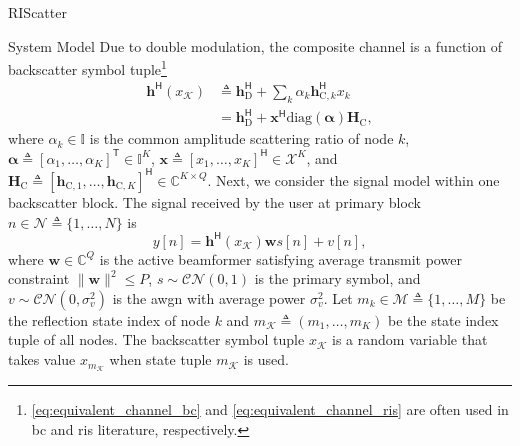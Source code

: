 \documentclass[journal]{IEEEtran}
\begin{document}
\begin{section}{RIScatter}
\begin{subsection}{System Model}
		Due to double modulation, the composite channel is a function of backscatter symbol tuple\footnote{\eqref{eq:equivalent_channel_bc} and \eqref{eq:equivalent_channel_ris} are often used in \gls{bc} and \gls{ris} literature, respectively.}
		\begin{subequations}
			\label{eq:equivalent_channel}
			\begin{align}
				\boldsymbol{h}^\mathsf{H}(x_{\mathcal{K}})
				 & \triangleq \boldsymbol{h}_{\text{D}}^\mathsf{H} + \sum_{k} \alpha_k \boldsymbol{h}_{\text{C},k}^\mathsf{H} x_k \label{eq:equivalent_channel_bc}                    \\
				 & = \boldsymbol{h}_{\text{D}}^\mathsf{H} + \boldsymbol{x}^\mathsf{H} \mathrm{diag}(\boldsymbol{\alpha}) \boldsymbol{H}_{\text{C}}, \label{eq:equivalent_channel_ris}
			\end{align}
		\end{subequations}
		where $\alpha_k \in \mathbb{I}$ is the common amplitude scattering ratio of node $k$, $\boldsymbol{\alpha} \triangleq [\alpha_1,\ldots,\alpha_K]^\mathsf{T} \in \mathbb{I}^{K}$, $\boldsymbol{x} \triangleq [x_1,\ldots,x_K]^\mathsf{H} \in \mathcal{X}^{K}$, and $\boldsymbol{H}_{\text{C}} \triangleq [\boldsymbol{h}_{\text{C},1},\ldots,\boldsymbol{h}_{\text{C},K}]^\mathsf{H} \in \mathbb{C}^{K \times Q}$.
		Next, we consider the signal model within one backscatter block.
		The signal received by the user at primary block $n \in \mathcal{N} \triangleq \{1,\ldots,N\}$ is
		\begin{equation}
			y[n] = \boldsymbol{h}^\mathsf{H}(x_{\mathcal{K}}) \boldsymbol{w} s[n] + v[n],
			\label{eq:receive_signal}
		\end{equation}
		where $\boldsymbol{w} \in \mathbb{C}^{Q}$ is the active beamformer satisfying average transmit power constraint $\lVert \boldsymbol{w} \rVert^2 \le P$, $s \sim \mathcal{CN}(0,1)$ is the primary symbol, and $v \sim \mathcal{CN}(0,\sigma_v^2)$ is the \gls{awgn} with average power $\sigma_v^2$.
		Let $m_k \in \mathcal{M} \triangleq \{1,\ldots,M\}$ be the reflection state index of node $k$ and $m_{\mathcal{K}} \triangleq (m_1,\ldots,m_K)$ be the state index tuple of all nodes.
		The backscatter symbol tuple $x_{\mathcal{K}}$ is a random variable that takes value $x_{m_{\mathcal{K}}}$ when state tuple $m_{\mathcal{K}}$ is used.

\end{subsection}
\end{section}
\end{document}
